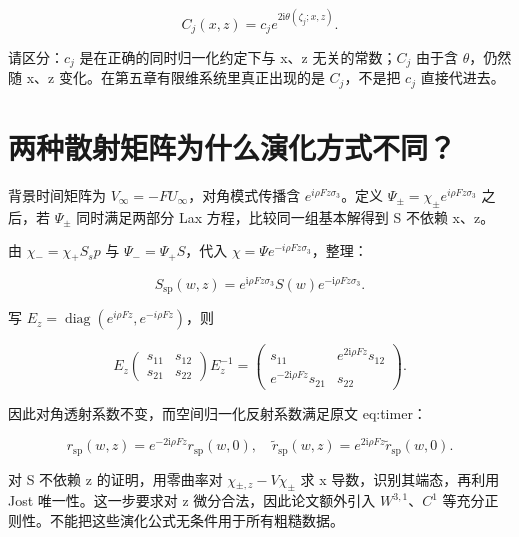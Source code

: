 \[
C_j(x,z)=c_j e^{2\mathrm{i}\theta(\zeta_j;x,z)}.
\]

请区分：$c_j$ 是在正确的同时归一化约定下与 x、z 无关的常数；$C_j$ 由于含 $\theta{}$，仍然随 x、z 变化。在第五章有限维系统里真正出现的是 $C_j$，不是把 $c_j$ 直接代进去。\par

\section{两种散射矩阵为什么演化方式不同？}
\par

背景时间矩阵为 $V_{\infty}=-FU_{\infty}$，对角模式传播含 $e^{i\rho{}Fz\sigma{}_{3}}$。定义 $\Psi_{\pm}=\chi_{\pm}e^{i\rho{}Fz\sigma{}_{3}}$ 之后，若 $\Psi_{\pm}$ 同时满足两部分 Lax 方程，比较同一组基本解得到 S 不依赖 x、z。\par

由 $\chi{}_{-}=\chi{}_{+}S_sp$ 与 $\Psi{}_{-}=\Psi{}_{+}S$，代入 $\chi{}=\Psi{}e^{-i\rho{}Fz\sigma{}_{3}}$，整理：\par

\[
S_{\mathrm{sp}}(w,z)
=e^{\mathrm{i}\rho Fz\sigma_3}S(w)
e^{-\mathrm{i}\rho Fz\sigma_3}.
\]

写 $E_z=\operatorname{diag}(e^{i\rho{}Fz},e^{-i\rho{}Fz})$，则\par

\[
E_z\begin{pmatrix}s_{11}&s_{12}\\s_{21}&s_{22}\end{pmatrix}E_z^{-1}
=\begin{pmatrix}
s_{11}&e^{2\mathrm{i}\rho Fz}s_{12}\\
e^{-2\mathrm{i}\rho Fz}s_{21}&s_{22}
\end{pmatrix}.
\]

因此对角透射系数不变，而空间归一化反射系数满足原文 eq:timer：\par

\[
r_{\mathrm{sp}}(w,z)
=e^{-2\mathrm{i}\rho Fz}r_{\mathrm{sp}}(w,0),
\quad
\widetilde r_{\mathrm{sp}}(w,z)
=e^{2\mathrm{i}\rho Fz}\widetilde r_{\mathrm{sp}}(w,0).
\]

对 S 不依赖 z 的证明，用零曲率对 $\chi{}_{\pm{},z}-V\chi_{\pm}$ 求 x 导数，识别其端态，再利用 Jost 唯一性。这一步要求对 z 微分合法，因此论文额外引入 $W^{3,1}$、$C^{1}$ 等充分正则性。不能把这些演化公式无条件用于所有粗糙数据。\par

